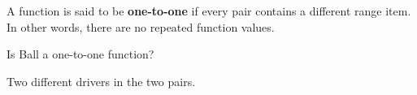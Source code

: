 \documentclass{ximera}
\begin{document}
\begin{definition}
  A function is said to be \textbf{one-to-one} if every pair contains a different range item.   In other words, there are no repeated function values.
  
\end{definition}



\begin{exercise}
 Is Ball a one-to-one function?
  \begin{multipleChoice}
  \end{multipleChoice}
  \begin{feedback}
Two different drivers in the two pairs.
  \end{feedback}
\end{exercise}
\end{document}
